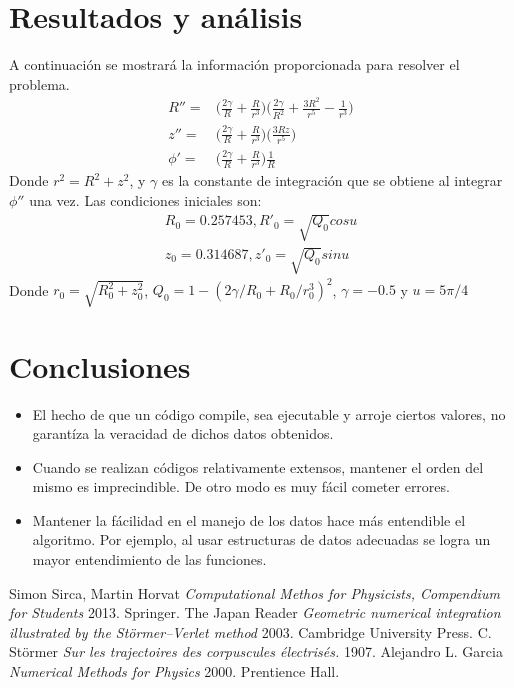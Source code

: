 \documentclass[10pt,twocolumn]{article}
\begin{document}
\section{Resultados y análisis}
A continuación se mostrará la información proporcionada \cite{problem} para resolver el problema.
\begin{equation}\label{problem}
\begin{split}
R''=&\Big(\frac{2\gamma}{R}+\frac{R}{r^3}\Big)\Big(\frac{2\gamma}{R^2}+\frac{3R^2}{r^5}-\frac{1}{r^3}\Big)\\
z''=&\Big(\frac{2\gamma}{R}+\frac{R}{r^3}\Big)\Big(\frac{3Rz}{r^5}\Big)\\
\phi'=&\Big(\frac{2\gamma}{R}+\frac{R}{r^3}\Big)\frac{1}{R}
\end{split}
\end{equation}
Donde $r^2=R^2+z^2$, y $\gamma$ es la constante de integración que se obtiene al integrar $\phi''$ una vez.
Las condiciones iniciales son: 
\begin{equation}
\begin{split}
R_0=0.257453, R'_0=\sqrt{Q_0}cos u\\ z_0=0.314687,  z'_0=\sqrt{Q_0}sin u
\end{split}
\end{equation} 
Donde $r_0=\sqrt{R_0^2+z_0^2}$, $Q_0=1-(2\gamma/R_0+R_0/r_0^3)^2$, $\gamma=-0.5$ y $u=5\pi/4$
\section{Conclusiones}
\begin{itemize}
\item El hecho de que un código compile, sea ejecutable y arroje ciertos valores, no garantíza la veracidad de dichos datos obtenidos.
\item Cuando se realizan códigos relativamente extensos, mantener el orden del mismo es imprecindible. De otro modo es muy fácil cometer errores.
\item Mantener la fácilidad en el manejo de los datos hace más entendible el algoritmo. Por ejemplo, al usar estructuras de datos adecuadas se logra un mayor entendimiento de las funciones.
\end{itemize}
\begin{thebibliography}{1}
   Simon Sirca, Martin Horvat {\em Computational Methos for Physicists, Compendium for Students}  2013. Springer.
    The Japan Reader {\em Geometric numerical integration
illustrated by the Störmer–Verlet method} 2003.
  Cambridge University Press.
    C. Störmer {\em Sur les trajectoires des corpuscules électrisés.} 1907.
    Alejandro L. Garcia {\em Numerical Methods for Physics} 2000.  Prentience Hall.
  \end{thebibliography}
\end{document}
